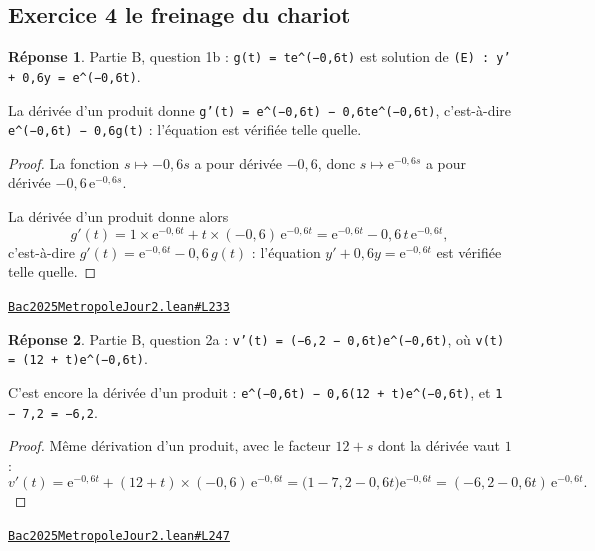 \documentclass[11pt,a4paper]{article}
\theoremstyle{definition}
\theoremstyle{plain}
\theoremstyle{definition}
\newtheorem*{reponse}{Réponse}
\newcommand{\source}[2]{\par\smallskip\noindent\hfill{\footnotesize\href{#1}{\texttt{#2}}}\par\smallskip}
\begin{document}
\subsection{Exercice 4 \textemdash{} le freinage du chariot}

\begin{reponse}
Partie B, question 1b : \texttt{g(t) = te\textasciicircum{}(−0,6t)} est solution de
\texttt{(E) : y' + 0,6y = e\textasciicircum{}(−0,6t)}.

La dérivée d'un produit donne \texttt{g'(t) = e\textasciicircum{}(−0,6t) − 0,6te\textasciicircum{}(−0,6t)}, c'est-à-dire
\texttt{e\textasciicircum{}(−0,6t) − 0,6g(t)} : l'équation est vérifiée telle quelle.
\end{reponse}
\begin{proof}
La fonction $s \mapsto -0{,}6s$ a pour dérivée $-0{,}6$, donc $s \mapsto
\mathrm{e}^{-0{,}6s}$ a pour dérivée $-0{,}6\,\mathrm{e}^{-0{,}6s}$.

La dérivée d'un produit donne alors
\[ g'(t) = 1 \times \mathrm{e}^{-0{,}6t} + t \times (-0{,}6)\,\mathrm{e}^{-0{,}6t}
   = \mathrm{e}^{-0{,}6t} - 0{,}6\,t\,\mathrm{e}^{-0{,}6t} , \]
c'est-à-dire $g'(t) = \mathrm{e}^{-0{,}6t} - 0{,}6\,g(t)$ : l'équation
$y' + 0{,}6y = \mathrm{e}^{-0{,}6t}$ est vérifiée telle quelle.
\end{proof}
\source{https://github.com/Commutator-IO/learn-lean/blob/main/exams/2025/Bac2025MetropoleJour2.lean\#L233}{Bac2025MetropoleJour2.lean\#L233}

\begin{reponse}
Partie B, question 2a : \texttt{v'(t) = (−6,2 − 0,6t)e\textasciicircum{}(−0,6t)}, où
\texttt{v(t) = (12 + t)e\textasciicircum{}(−0,6t)}.

C'est encore la dérivée d'un produit : \texttt{e\textasciicircum{}(−0,6t) − 0,6(12 + t)e\textasciicircum{}(−0,6t)}, et
\texttt{1 − 7,2 = −6,2}.
\end{reponse}
\begin{proof}
Même dérivation d'un produit, avec le facteur $12 + s$ dont la dérivée vaut $1$ :
\[ v'(t) = \mathrm{e}^{-0{,}6t} + (12 + t) \times (-0{,}6)\,\mathrm{e}^{-0{,}6t}
   = \bigl(1 - 7{,}2 - 0{,}6t\bigr)\mathrm{e}^{-0{,}6t}
   = (-6{,}2 - 0{,}6t)\,\mathrm{e}^{-0{,}6t} . \]
\end{proof}
\source{https://github.com/Commutator-IO/learn-lean/blob/main/exams/2025/Bac2025MetropoleJour2.lean\#L247}{Bac2025MetropoleJour2.lean\#L247}
\end{document}
